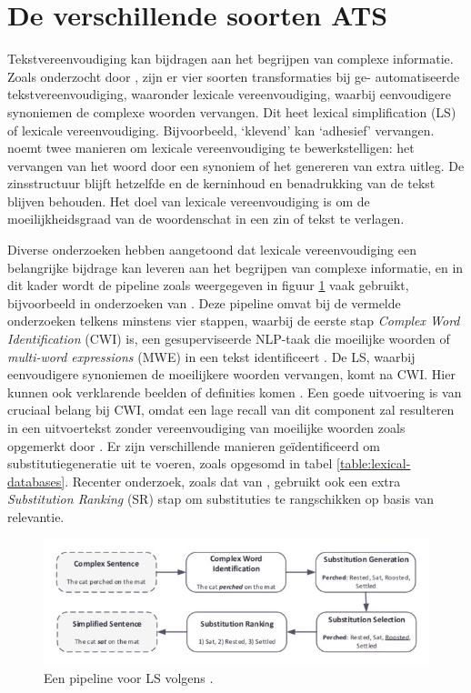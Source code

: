 \section{De verschillende soorten ATS}

Tekstvereenvoudiging kan bijdragen aan het begrijpen van complexe informatie. Zoals onderzocht door \textcite{Siddharthan2014}, zijn er vier soorten transformaties bij ge- automatiseerde tekstvereenvoudiging, waaronder lexicale vereenvoudiging, waarbij eenvoudigere synoniemen de complexe woorden vervangen. Dit heet lexical simplification (LS) of lexicale vereenvoudiging. Bijvoorbeeld, ‘klevend’ kan ‘adhesief’ vervangen. \textcite{Kandula2010} noemt twee manieren om lexicale vereenvoudiging te bewerkstelligen: het vervangen van het woord door een synoniem of het genereren van extra uitleg. De zinsstructuur blijft hetzelfde en de kerninhoud en benadrukking van de tekst blijven behouden. Het doel van lexicale vereenvoudiging is om de moeilijkheidsgraad van de woordenschat in een zin of tekst te verlagen.

\medspace

Diverse onderzoeken hebben aangetoond dat lexicale vereenvoudiging een belangrijke bijdrage kan leveren aan het begrijpen van complexe informatie, en in dit kader wordt de pipeline zoals weergegeven in figuur \ref{img:pipeline-lexical-simplification} vaak gebruikt, bijvoorbeeld in onderzoeken van \textcite{Paetzold2016, Bingel2018, Bulte2018}. Deze pipeline omvat bij de vermelde onderzoeken telkens minstens vier stappen, waarbij de eerste stap \textit{Complex Word Identification} (CWI) is, een gesuperviseerde NLP-taak die moeilijke woorden of \textit{multi-word expressions} (MWE) in een tekst identificeert \autocite{Shardlow2013, Gooding2019}. De LS, waarbij eenvoudigere synoniemen de moeilijkere woorden vervangen, komt na CWI. Hier kunnen ook verklarende beelden of definities komen \autocite{Zeng2005, Kandula2010}. Een goede uitvoering is van cruciaal belang bij CWI, omdat een lage recall van dit component zal resulteren in een uitvoertekst zonder vereenvoudiging van moeilijke woorden zoals opgemerkt door \textcite{Shardlow2013}. Er zijn verschillende manieren geïdentificeerd om substitutiegeneratie uit te voeren, zoals opgesomd in tabel \ref{table:lexical-databases}. Recenter onderzoek, zoals dat van \textcite{Zhou2019}, gebruikt ook een extra \textit{Substitution Ranking} (SR) stap om substituties te rangschikken op basis van relevantie. 

\begin{figure}[H]
	\includegraphics[width=15cm]{img/lexical-simplification-pipeline.png}
	\caption{Een pipeline voor LS volgens \textcite{Althunayyan2021}.}
	\label{img:pipeline-lexical-simplification}
\end{figure}

